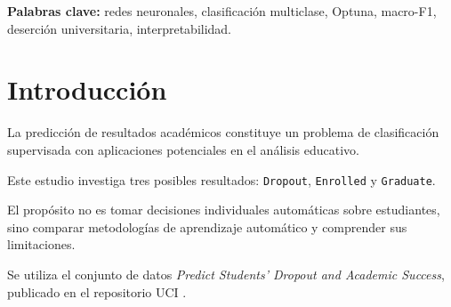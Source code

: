 \documentclass[11pt,a4paper]{article}
\begin{document}
\begin{abstract}
Este trabajo estudia la predicción del estado académico
universitario mediante redes neuronales artificiales.
Se empleó el conjunto de datos UCI 697, compuesto por
4424 estudiantes, 36 variables predictoras y tres clases:
abandono, permanencia y graduación.

Se diseñaron cuatro escenarios de disponibilidad de
información, se entrenaron modelos base con Keras y
se realizaron 80 ensayos de optimización mediante
Optuna y el algoritmo TPE.

Además, se investigó el efecto del balanceo de clases
mediante nueve entrenamientos adicionales.
El modelo principal, con balanceo moderado,
obtuvo un macro-F1 de 0,7107 en prueba.
Su recall para la clase Enrolled fue de 0,5220,
frente a 0,4403 del modelo Optuna sin balanceo.

El análisis bootstrap pareado no proporcionó
evidencia concluyente de mejora global en macro-F1,
aunque el intervalo para la diferencia en recall de
Enrolled fue positivo.
La importancia por permutación destacó el rendimiento
académico del segundo semestre como información predictiva
especialmente relevante.

Los resultados muestran la utilidad de la optimización y
del análisis de desbalance, así como la necesidad de
evaluar las compensaciones entre clases.
\end{abstract}

\noindent\textbf{Palabras clave:}
redes neuronales, clasificación multiclase,
Optuna, macro-F1, deserción universitaria,
interpretabilidad.

\tableofcontents
\clearpage

\section{Introducción}

La predicción de resultados académicos constituye
un problema de clasificación supervisada con
aplicaciones potenciales en el análisis educativo.

Este estudio investiga tres posibles resultados:
\texttt{Dropout}, \texttt{Enrolled} y
\texttt{Graduate}.

El propósito no es tomar decisiones individuales
automáticas sobre estudiantes, sino comparar
metodologías de aprendizaje automático y
comprender sus limitaciones.

Se utiliza el conjunto de datos
\emph{Predict Students' Dropout and Academic Success},
publicado en el repositorio UCI \cite{uci697}.
\end{document}
